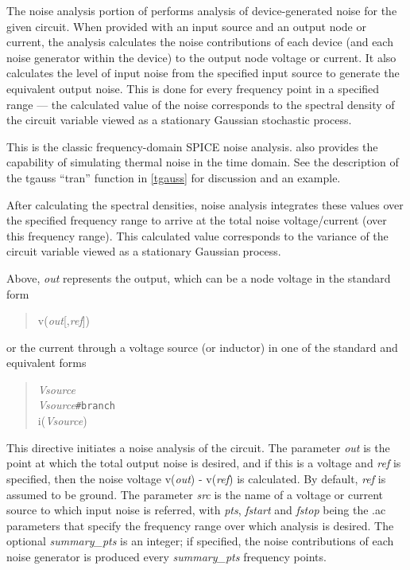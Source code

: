 
The noise analysis portion of {\WRspice} performs analysis of
device-generated noise for the given circuit.  When provided with an
input source and an output node or current, the analysis calculates
the noise contributions of each device (and each noise generator
within the device) to the output node voltage or current.  It also
calculates the level of input noise from the specified input source
to generate the equivalent output noise.  This is done for every
frequency point in a specified range --- the calculated value of the
noise corresponds to the spectral density of the circuit variable
viewed as a stationary Gaussian stochastic process.

This is the classic frequency-domain SPICE noise analysis.  {\WRspice}
also provides the capability of simulating thermal noise in the time
domain.  See the description of the {\vt tgauss} ``tran'' function in
\ref{tgauss} for discussion and an example.

After calculating the spectral densities, noise analysis integrates
these values over the specified frequency range to arrive at the total
noise voltage/current (over this frequency range).  This calculated
value corresponds to the variance of the circuit variable viewed as a
stationary Gaussian process.


Above, {\it out} represents the output, which can be a node voltage
in the standard form
\begin{quote}
 v({\it out\/}[,{\it ref\/}])
\end{quote}
or the current through a voltage source (or inductor) in one of the
standard and equivalent forms
\begin{quote}
 {\it Vsource}\\
 {\it Vsource\/}{\tt \#branch}\\
 {\vt i(}{\it Vsource\/}{\vt )}
\end{quote}

This directive initiates a noise analysis of the circuit.  The
parameter {\it out} is the point at which the total output noise is
desired, and if this is a voltage and {\it ref} is specified, then
the noise voltage v({\it out\/}) - v({\it ref\/}) is calculated.  By
default, {\it ref\/} is assumed to be ground.  The parameter {\it
src\/} is the name of a voltage or current source to which input
noise is referred, with {\it pts\/}, {\it fstart\/} and {\it fstop\/}
being the {\vt .ac} parameters that specify the frequency range over
which analysis is desired.  The optional {\it summary\_pts\/} is an
integer; if specified, the noise contributions of each noise
generator is produced every {\it summary\_pts\/} frequency points.

